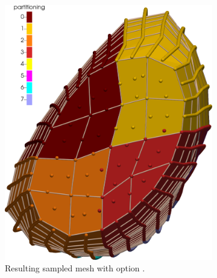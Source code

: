 \begin{figure}%
  \centering%
  \begin{subfigure}[t]{0.48\textwidth}%
    \centering%
    \includegraphics[width=\textwidth]{images/implementation/partitioning4.png}
    \caption{Resulting sampled mesh with option .}%
    \label{fig:partitioning4}%
  \end{subfigure}
  \quad
  \begin{subfigure}[t]{0.48\textwidth}%
    \centering%

\end{subfigure}
\end{figure}
